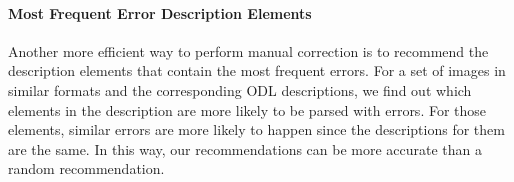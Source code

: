 
\paragraph{Most Frequent Error Description Elements}
Another more efficient way to perform manual correction is to
recommend the description
elements that contain the most frequent errors. For a set of images
in similar formats and the corresponding ODL descriptions,
we find out which elements in the description are more likely
to be parsed with errors. For those elements, similar errors
are more likely to happen since the descriptions for them are the
same. In this way, our recommendations can be more
accurate than
a random recommendation.


